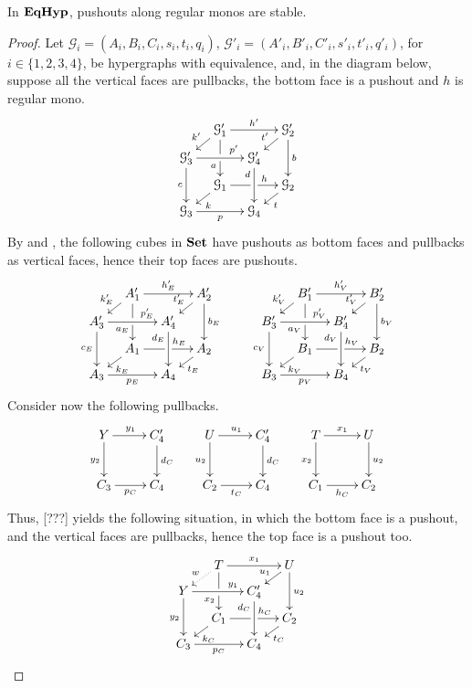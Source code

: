 \begin{lemma}\label{lemma:stab}
	In $\textbf{\textup{EqHyp}}$, pushouts along regular monos are stable.
\end{lemma}

\begin{proof}
	Let $\mathcal{G}_i = (A_i, B_i, C_i, s_i, t_i, q_i)$, $\mathcal{G}'_i=(A'_i, B'_i, C'_i, s'_i, t'_i, q'_i)$, for $i \in \{1, 2, 3, 4\}$, be hypergraphs with equivalence, 
	and, in the diagram below, suppose all the vertical faces are pullbacks, the bottom face is a pushout and $h$ is regular mono.
                \[
		\xymatrix@C=10pt@R=6pt{&\mathcal{G}_1'\ar[dd]|\hole_(.65){a}\ar[rr]^{h'} \ar[dl]_{k'} && \mathcal{G}_2' \ar[dd]^{b} \ar[dl]_{t'} \\ \mathcal{G}_3'  \ar[dd]_{c}\ar[rr]^(.7){p'} & & \mathcal{G}_4' \ar[dd]_(.3){d}\\&\mathcal{G}_1\ar[rr]|\hole^(.65){h} \ar[dl]^{k} && \mathcal{G}_2 \ar[dl]^{t} \\\mathcal{G}_3 \ar[rr]_{p} & & \mathcal{G}_4 }
	\]
	By  and , the following cubes in $\mathbf{Set}$ have pushouts as bottom faces and pullbacks as vertical faces, hence their top faces are pushouts.
	\[
        \xymatrix@C=10pt@R=6pt{&A_1'\ar[dd]|\hole_(.65){a_E}\ar[rr]^{h_E'} \ar[dl]_{k_E'} && A_2' \ar[dd]^{b_E} \ar[dl]_{t_E'} \\ A_3'  \ar[dd]_{c_E}\ar[rr]^(.7){p_E'} & & A_4' \ar[dd]_(.3){d_E}\\&A_1\ar[rr]|\hole^(.65){h_E} \ar[dl]^{k_E} && A_2 \ar[dl]^{t_E} \\A_3 \ar[rr]_{p_E} & & A_4 }
	\qquad
        \xymatrix@C=10pt@R=6pt{&B_1'\ar[dd]|\hole_(.65){a_V}\ar[rr]^{h_V'} \ar[dl]_{k_V'} && B_2' \ar[dd]^{b_V} \ar[dl]_{t_V'} \\ B_3'  \ar[dd]_{c_V}\ar[rr]^(.7){p_V'} & & B_4' \ar[dd]_(.3){d_V}\\&B_1\ar[rr]|\hole^(.65){h_V} \ar[dl]^{k_V} && B_2 \ar[dl]^{t_V} \\B_3 \ar[rr]_{p_V} & & B_4 }
	\]
	Consider now the following pullbacks.
	\[\xymatrix{
			Y \ar[d]_{y_2}\ar[r]^{y_1}&{C_4'}\ar[d]^{d_C}&U\ar[d]_{u_2}\ar[r]^{u_1}&{C_4'}\ar[d]^{d_C}&T\ar[r]^{x_1}\ar[d]_{x_2}&U\ar[d]^{u_2}\\
			C_3\ar[r]_{p_C}&C_4&C_2\ar[r]_{t_C}&C_4&C_1\ar[r]_{h_C}&C_2
	}\]
	Thus, [???] yields the following situation, in which the bottom face is a pushout, and the vertical faces are pullbacks, hence the top face is a pushout too.
        \[\xymatrix@C=10pt@R=6pt{&T\ar[dd]|\hole_(.65){x_2}\ar[rr]^{x_1} \ar@{.>}[dl]_{w} && U \ar[dd]^{u_2} \ar[dl]_{u_1} \\ Y  \ar[dd]_{y_2}\ar[rr]^(.7){y_1} & & C_4' \ar[dd]_(.3){d_C}\\&C_1\ar[rr]|\hole^(.65){h_C} \ar[dl]^{k_C} && C_2 \ar[dl]^{t_C} \\C_3 \ar[rr]_{p_C} & & C_4 }\]

\end{proof}

